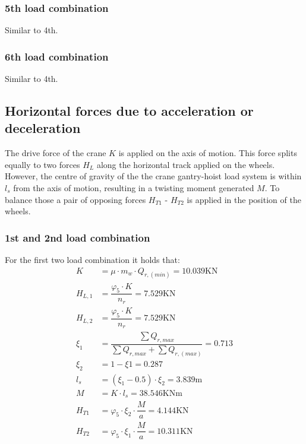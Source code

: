 \documentclass[a4paper,10pt, final, oneside, fleqn, onecolumn]{article}	%
\begin{document}
\subsubsection{5th load combination}Similar to 4th.

\subsubsection{6th load combination}Similar to 4th.

\subsection{Horizontal forces due to acceleration or deceleration}

The drive force of the crane $ K $ is applied on the axis of motion. This force splits equally
to two forces $ H_L $ along the horizontal track applied on the wheels. However, the 
centre of gravity of the the crane gantry-hoist load system is within $ l_s $ from the axis of 
motion, resulting in a twisting moment generated $ M $. To balance those a pair of opposing 
forces $ H_ {T1} $ - $ H_ {T2} $ is applied in the position of the wheels.


\subsubsection{1st and 2nd load combination}

For the first two load combination it holds that:
\begin{align*}
    K         &= μ \cdot m_w \cdot Q_{r,(min)}  = 10.039 \text{KN} \\
    H_{L,1}   &= \dfrac{φ_5 \cdot K} {n_r} = 7.529 \text{KN} \\
    H_{L,2}   &= \dfrac{φ_5 \cdot K} {n_r} = 7.529 \text{KN} \\
    ξ_1       &= \dfrac{\displaystyle\sum{Q_{r,max}}}{\displaystyle\sum{Q_{r,max} + \displaystyle\sum{Q_{r,(max)}}}} = 0.713 \\
    ξ_2       &= 1 - ξ1 = 0.287 \\
    l_s       &= (ξ_1 - 0.5) \cdot ξ_2 = 3.839 \text{m} \\
    M         &= K \cdot l_s = 38.546 \text{KNm} \\
    H_{T1}    &= φ_5 \cdot ξ_2 \cdot \dfrac{M}{a} = 4.144 \text{KN} \\
    H_{T2}    &= φ_5 \cdot ξ_1 \cdot \dfrac{M}{a} = 10.311 \text{KN}
\end{align*}
\end{document}
